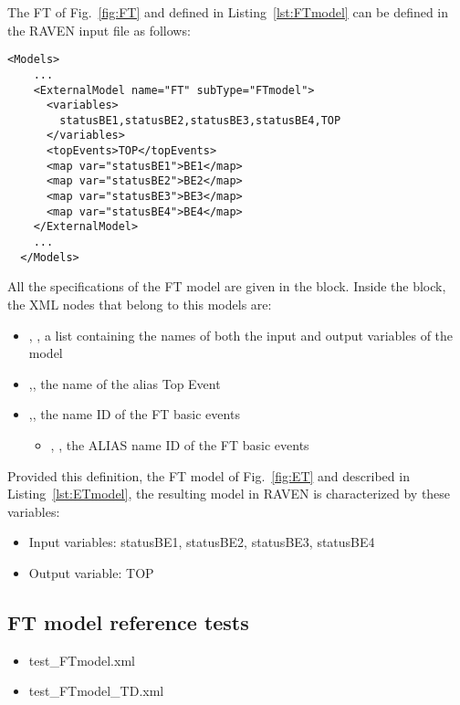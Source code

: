 The FT of Fig.~\ref{fig:FT} and defined in Listing~\ref{lst:FTmodel} can be defined in the RAVEN input file as follows:

\begin{lstlisting}[style=XML,morekeywords={anAttribute},caption=FT model input example., label=lst:FT_InputExample]
  <Models> 
    ...
    <ExternalModel name="FT" subType="FTmodel">
      <variables>
        statusBE1,statusBE2,statusBE3,statusBE4,TOP
      </variables>
      <topEvents>TOP</topEvents>
      <map var="statusBE1">BE1</map>
      <map var="statusBE2">BE2</map>
      <map var="statusBE3">BE3</map>
      <map var="statusBE4">BE4</map>
    </ExternalModel>
    ...
  </Models>
\end{lstlisting}

All the specifications of the FT model are given in the 
 block. 
Inside the  block, the XML
nodes that belong to this models are:
\begin{itemize}
  \item  {}, , a list containing the names of both the input and output variables of the model
  \item  {},, the name of the alias Top Event
  \item  {},, the name ID of the FT basic events
	  \begin{itemize}
	    \item {}, , the ALIAS name ID of the FT basic events
	  \end{itemize}
\end{itemize}

Provided this definition, the FT model of Fig.~\ref{fig:ET} and described in Listing~\ref{lst:ETmodel}, 
the resulting model in RAVEN is characterized by these variables:
\begin{itemize}
	\item Input variables: statusBE1, statusBE2, statusBE3, statusBE4
	\item Output variable: TOP
\end{itemize}

\subsection{FT model reference tests}
\begin{itemize}
	\item test\_FTmodel.xml
	\item test\_FTmodel\_TD.xml
\end{itemize}